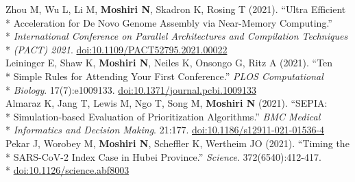\documentclass[margin,line]{res}
\begin{document}
\begin{resume}
\hspace*{4mm} Zhou M, Wu L, Li M, \textbf{Moshiri N}, Skadron K, Rosing T (2021). ``Ultra Efficient\\*
\hspace*{9mm} Acceleration for De Novo Genome Assembly via Near-Memory Computing.''\\*
\hspace*{9mm} \textit{International Conference on Parallel Architectures and Compilation Techniques}\\*\vspace{2mm}
\hspace*{8mm} \textit{(PACT) 2021}. \href{https://doi.org/10.1109/PACT52795.2021.00022}{doi:10.1109/PACT52795.2021.00022}\\
\hspace*{4mm} Leininger E, Shaw K, \textbf{Moshiri N}, Neiles K, Onsongo G, Ritz A (2021). ``Ten\\*
\hspace*{9mm} Simple Rules for Attending Your First Conference.'' \textit{PLOS Computational}\\*\vspace{2mm}
\hspace*{8mm} \textit{Biology}. 17(7):e1009133. \href{https://doi.org/10.1371/journal.pcbi.1009133}{doi:10.1371/journal.pcbi.1009133}\\
\hspace*{4mm} Almaraz K, Jang T, Lewis M, Ngo T, Song M, \textbf{Moshiri N} (2021). ``SEPIA:\\*
\hspace*{9mm} Simulation-based Evaluation of Prioritization Algorithms.'' \textit{BMC Medical}\\*\vspace{2mm}
\hspace*{8mm} \textit{Informatics and Decision Making}. 21:177. \href{https://doi.org/10.1186/s12911-021-01536-4}{doi:10.1186/s12911-021-01536-4}\\
\hspace*{4mm} Pekar J, Worobey M, \textbf{Moshiri N}, Scheffler K, Wertheim JO (2021). ``Timing the\\*
\hspace*{9mm} SARS-CoV-2 Index Case in Hubei Province.'' \textit{Science}. 372(6540):412-417.\\*\vspace{2mm}
\hspace*{8mm} \href{https://doi.org/10.1126/science.abf8003}{doi:10.1126/science.abf8003}\\

\end{resume}
\end{document}
